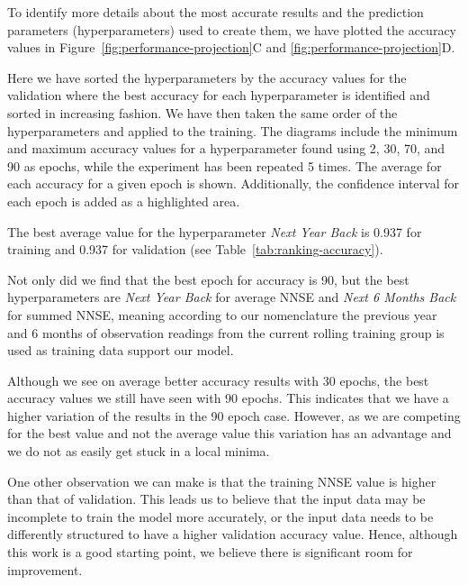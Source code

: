         
To identify more details about the most accurate results and the prediction parameters (hyperparameters) used to create them, we have plotted the accuracy values in Figure~\ref{fig:performance-projection}C and \ref{fig:performance-projection}D.

Here we have sorted the hyperparameters by the accuracy values for the validation where the best accuracy for each hyperparameter is identified and sorted in increasing fashion. We have then taken the same order of the hyperparameters and applied to the training.  The diagrams include the minimum and maximum accuracy values for a hyperparameter found using 2, 30, 70, and 90 as epochs, while the experiment has been repeated 5 times. The average for each accuracy for a given epoch is shown. Additionally, the confidence interval for each epoch is added as a highlighted area.

The best average value for the hyperparameter {\em Next Year Back} is 0.937 for training and 0.937 for validation (see Table~\ref{tab:ranking-accuracy}).

Not only did we find that the best epoch for accuracy is 90, but the best hyperparameters are {\em Next Year Back} for average NNSE and {\em Next 6 Months Back} for summed NNSE, meaning according to our nomenclature the previous year and 6 months of observation readings from the current rolling training group is used as training data support our model.

Although we see on average better accuracy results with 30 epochs, the best accuracy values we still have seen with 90 epochs. This indicates that we have a higher variation of the results in the 90 epoch case. However, as we are competing for the best value and not the average value this variation has an advantage and we do not as easily get stuck in a local minima.

One other observation we can make is that the training NNSE value is higher than that of validation. This leads us to believe that the input data may be incomplete to train the model more accurately, or the input data needs to be differently structured to have a higher validation accuracy value.  Hence, although this work is a good starting point, we believe there is significant room for improvement.

